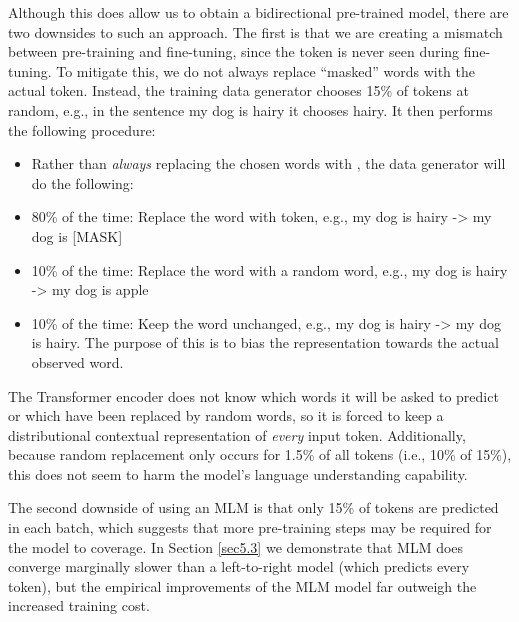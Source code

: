 		Although this does allow us to obtain a bidirectional pre-trained model, there are two downsides to such an approach. The first is that we are creating a mismatch between pre-training and fine-tuning, since the {\selectfont[MASK]} token is never seen during fine-tuning. To mitigate this, we do not always replace ``masked'' words with the actual {\selectfont[MASK]} token. Instead, the training data generator chooses 15\% of tokens at random, e.g., in the sentence {\small{\selectfont my dog is hairy}} it chooses {\small{\selectfont hairy}}. It then performs the following procedure:
		\begin{itemize}
			\item Rather than \emph{always} replacing the chosen words with {\selectfont[MASK]}, the data generator will do the following: 
			\item 80\% of the time: Replace the word with {\selectfont[MASK]} token, e.g., {\small{\selectfont my dog is hairy -> my dog is [MASK]}} 
			\item 10\% of the time: Replace the word with a random word, e.g., {\small{\selectfont my dog is hairy -> my dog is apple}} 
			\item 10\% of the time: Keep the word unchanged, e.g., {\small{\selectfont my dog is hairy -> my dog is hairy}}. The purpose of this is to bias the representation towards the actual observed word. 
		\end{itemize}
		
		The Transformer encoder does not know which words it will be asked to predict or which have been replaced by random words, so it is forced to keep a distributional contextual representation of \emph{every} input token. Additionally, because random replacement only occurs for 1.5\% of all tokens (i.e., 10\% of 15\%), this does not seem to harm the model's language understanding capability.
		
		The second downside of using an MLM is that only 15\% of tokens are predicted in each batch, which suggests that more pre-training steps may be required for the model to coverage. In Section \ref{sec5.3} we demonstrate that MLM does converge marginally slower than a left-to-right model (which predicts every token), but the empirical improvements of the MLM model far outweigh the increased training cost.
		
